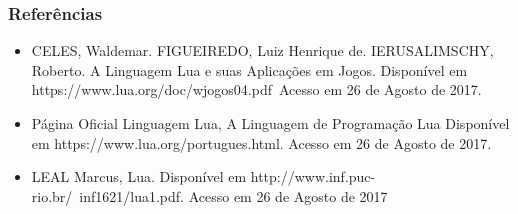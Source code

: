 \documentclass{beamer}
\begin{document}
\begin{frame}
    \frametitle{Referências}
    \begin{itemize}
        \item CELES, Waldemar. FIGUEIREDO, Luiz Henrique de. IERUSALIMSCHY, Roberto. A Linguagem Lua e suas Aplicações em Jogos. Disponível em https://www.lua.org/doc/wjogos04.pdf\  Acesso em 26 de Agosto de 2017.
        \item Página Oficial Linguagem Lua, A Linguagem de Programação Lua Disponível em https://www.lua.org/portugues.html. Acesso em 26 de Agosto de 2017.
        \item LEAL Marcus, Lua. Disponível em http://www.inf.puc-rio.br/~inf1621/lua1.pdf. Acesso em 26 de Agosto de 2017
    \end{itemize}
\end{frame}
\end{document}
